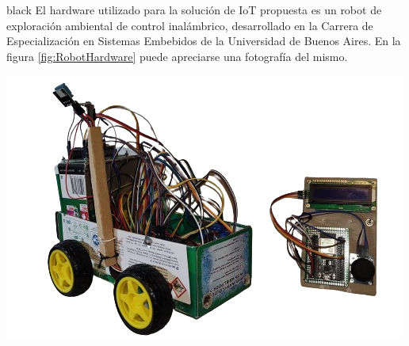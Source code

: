 \documentclass[
11pt, %
]{charter}
\begin{document}
\begin{consigna}{black}
El hardware utilizado para la solución de IoT propuesta es un robot de exploración ambiental de control inalámbrico, desarrollado en la Carrera de Especialización en Sistemas Embebidos de la Universidad de Buenos Aires. En la figura \ref{fig:RobotHardware} puede apreciarse una fotografía del mismo.

\begin{center}
 \includegraphics[scale=0.5]{Figuras/Robot_y_Joystick_1}
 \label{fig:RobotHardware}
\end{center}




\vspace{25px}


\end{consigna}
\end{document}
